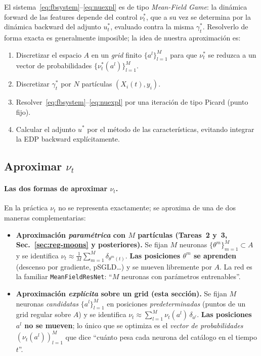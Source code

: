 \documentclass[11pt, a4paper]{article}
\theoremstyle{definition}
\begin{document}
\medskip

El sistema~\eqref{eq:fbsystem}--\eqref{eq:nuexpl} es de tipo
\emph{Mean-Field Game}: la dinámica forward de las features depende del
control $\nu_t^*$, que a su vez se determina por la dinámica backward
del adjunto $u_t^*$, evaluado contra la misma $\gamma_t^*$. Resolverlo
de forma exacta es generalmente imposible; la idea de nuestra
aproximación es:
\begin{enumerate}
  \item Discretizar el espacio $A$ en un \emph{grid} finito
        $\{a^l\}_{l=1}^{M}$ para que $\nu_t^*$ se reduzca a un vector
        de probabilidades $\{\nu_t^*(a^l)\}_{l=1}^{M}$.
  \item Discretizar $\gamma_t^*$ por $N$ partículas $(X_i(t), y_i)$.
  \item Resolver~\eqref{eq:fbsystem}--\eqref{eq:nuexpl} por una iteración
        de tipo Picard (punto fijo).
  \item Calcular el adjunto $u^*$ por el método de las características,
        evitando integrar la EDP backward explícitamente.
\end{enumerate}

\subsection{Aproximar $\nu_t$}
\label{ssec:neural-interp}

\paragraph{Las dos formas de aproximar $\nu_t$.}
En la práctica $\nu_t$ no se representa exactamente; se aproxima de
una de dos maneras complementarias:

\begin{itemize}
  \item \textbf{Aproximación \emph{paramétrica} con $M$ partículas
        (Tareas~2 y~3, Sec.~\ref{sec:reg-moons} y posteriores).}
        Se fijan $M$ neuronas
        $\{\theta^m\}_{m=1}^{M} \subset A$ y se identifica
        $\nu_t \approx \tfrac{1}{M}\sum_{m=1}^{M} \delta_{\theta^m(t)}$.
        \textbf{Las posiciones $\theta^m$ se aprenden} (descenso por
        gradiente, pSGLD\ldots) y se mueven libremente por $A$. La red
        es la familiar \texttt{MeanFieldResNet}: ``$M$ neuronas con
        parámetros entrenables''.

  \item \textbf{Aproximación \emph{explícita} sobre un grid
        (esta sección).}
        Se fijan $M$ neuronas \emph{candidatas} $\{a^l\}_{l=1}^{M}$
        en posiciones \emph{predeterminadas} (puntos de un grid
        regular sobre $A$) y se identifica
        $\nu_t \approx \sum_{l=1}^{M} \nu_t(a^l)\,\delta_{a^l}$.
        \textbf{Las posiciones $a^l$ no se mueven}; lo único que se
        optimiza es el \emph{vector de probabilidades}
        $(\nu_t(a^l))_{l=1}^M$ que dice ``cuánto pesa cada neurona
        del catálogo en el tiempo $t$''.
\end{itemize}
\end{document}
